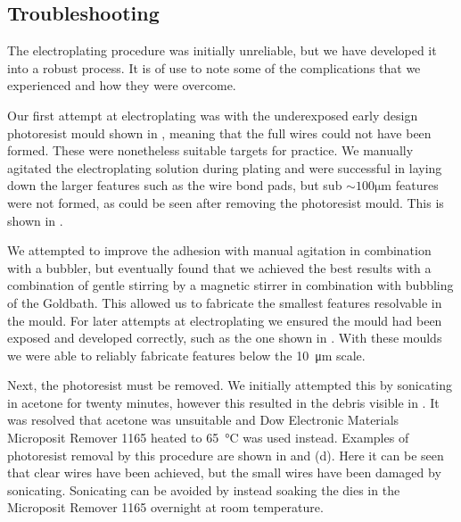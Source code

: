 \subsection{Troubleshooting}

The electroplating procedure was initially unreliable, but we have developed
it into a robust process. It is of use to note some of the complications
that we experienced and how they were overcome. 

Our first attempt at electroplating was with the underexposed early design
photoresist mould shown in , meaning that the
full wires could not have been formed. These were nonetheless suitable targets
for practice. We manually agitated the electroplating solution during plating
and were successful in laying down the larger features such as the wire bond
pads, but sub $\sim100\si{\micro\meter}$ features were not formed, as could be
seen after removing the photoresist mould. This is shown in 
.

We attempted to improve the adhesion with manual agitation in combination with
a bubbler, but eventually found that we achieved the best results with a
combination of gentle stirring by a magnetic stirrer in combination with
bubbling of the Goldbath. This allowed us to fabricate the smallest features
resolvable in the mould.  
%
For later attempts at electroplating we ensured the mould had been exposed and
developed correctly, such as the one shown in .
With these moulds we were able to reliably fabricate features below the
\SI{10}{\micro\meter} scale.

Next, the photoresist must be removed. We initially attempted this by 
sonicating in acetone for twenty minutes, however this resulted in the debris
visible in . It was resolved that acetone was
unsuitable and Dow Electronic Materials Microposit Remover 1165 heated to
\SI{65}{\celsius} was used instead.
%
Examples of photoresist removal by this procedure are shown in
 and (d). Here it can be seen that clear
wires have been achieved, but the small wires have been damaged by sonicating.
Sonicating can be avoided by instead soaking the dies in the Microposit Remover
1165 overnight at room temperature.


